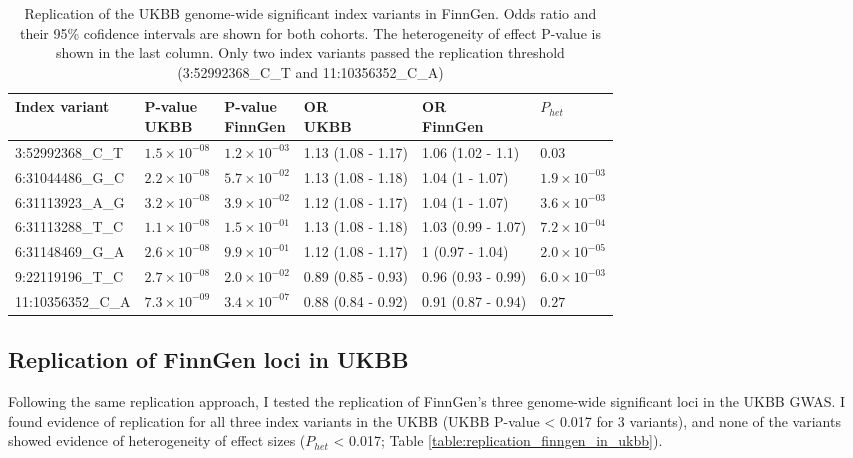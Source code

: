 \begin{table}[H]
  \centering\begingroup\fontsize{10}{12}\selectfont
  
  \caption{Replication of the UKBB genome-wide significant index variants in FinnGen. Odds ratio and their 95\% cofidence intervals are shown for both cohorts. The heterogeneity of effect P-value is shown in the last column. Only two index variants passed the replication threshold (3:52992368\_C\_T  and 11:10356352\_C\_A)}
  \label{table:replication_ukbb_in_finngen}
  \begin{tabular}[t]{llllll}
  \toprule
  Index variant & \makecell{P-value\\ UKBB} & \makecell{P-value\\ FinnGen} & \makecell{OR\\ UKBB} & \makecell{OR\\ FinnGen} & $P_{het}$\\
  \midrule
  3:52992368\_C\_T & $1.5\times10^{-08}$ & $1.2\times10^{-03}$ & 1.13 (1.08 - 1.17) & 1.06 (1.02 - 1.1) & $0.03$\\
  6:31044486\_G\_C & $2.2\times10^{-08}$ & $5.7\times10^{-02}$ & 1.13 (1.08 - 1.18) & 1.04 (1 - 1.07) & $1.9\times10^{-03}$\\
  6:31113923\_A\_G & $3.2\times10^{-08}$ & $3.9\times10^{-02}$ & 1.12 (1.08 - 1.17) & 1.04 (1 - 1.07) & $3.6\times10^{-03}$\\
  6:31113288\_T\_C & $1.1\times10^{-08}$ & $1.5\times10^{-01}$ & 1.13 (1.08 - 1.18) & 1.03 (0.99 - 1.07) & $7.2\times10^{-04}$\\
  6:31148469\_G\_A & $2.6\times10^{-08}$ & $9.9\times10^{-01}$ & 1.12 (1.08 - 1.17) & 1 (0.97 - 1.04) & $2.0\times10^{-05}$\\
  9:22119196\_T\_C & $2.7\times10^{-08}$ & $2.0\times10^{-02}$ & 0.89 (0.85 - 0.93) & 0.96 (0.93 - 0.99) & $6.0\times10^{-03}$\\
  11:10356352\_C\_A & $7.3\times10^{-09}$ & $3.4\times10^{-07}$ & 0.88 (0.84 - 0.92) & 0.91 (0.87 - 0.94) & $0.27$\\
  \bottomrule
  \end{tabular}
  \endgroup{}
  \end{table}




  \subsection{Replication of FinnGen loci in UKBB}
  Following the same replication approach, I tested the replication of FinnGen's three genome-wide significant loci in the UKBB GWAS. I found evidence of replication for all three index variants in the UKBB (UKBB P-value < 0.017 for 3 variants), and none of the variants showed evidence of heterogeneity of effect sizes ($P_{het}$ < 0.017; Table \ref{table:replication_finngen_in_ukbb}).

